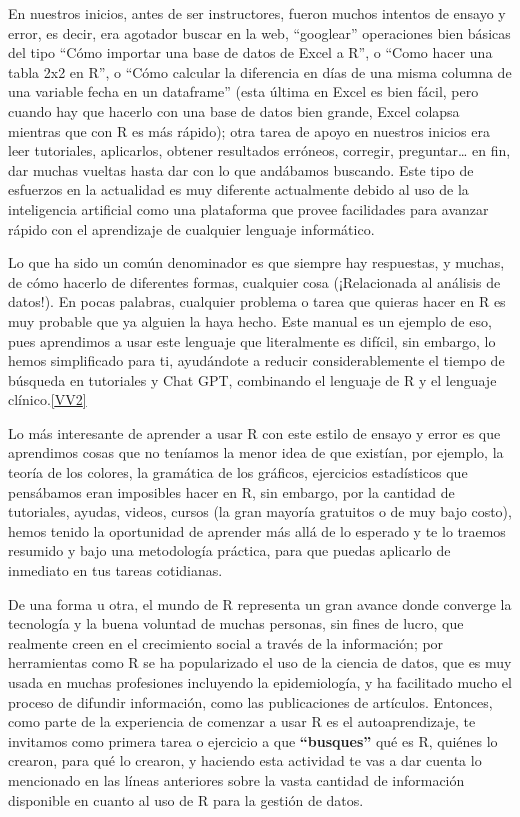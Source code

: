 \documentclass[
  letterpaper,
  DIV=11,
  numbers=noendperiod]{scrreprt}
\begin{document}
En nuestros inicios, antes de ser instructores, fueron muchos intentos
de ensayo y error, es decir, era agotador buscar en la web, ``googlear''
operaciones bien básicas del tipo ``Cómo importar una base de datos de
Excel a R'', o ``Como hacer una tabla 2x2 en R'', o ``Cómo calcular la
diferencia en días de una misma columna de una variable fecha en un
dataframe'' (esta última en Excel es bien fácil, pero cuando hay que
hacerlo con una base de datos bien grande, Excel colapsa mientras que
con R es más rápido); otra tarea de apoyo en nuestros inicios era leer
tutoriales, aplicarlos, obtener resultados erróneos, corregir,
preguntar\ldots{} en fin, dar muchas vueltas hasta dar con lo que
andábamos buscando. Este tipo de esfuerzos en la actualidad es muy
diferente actualmente debido al uso de la inteligencia artificial como
una plataforma que provee facilidades para avanzar rápido con el
aprendizaje de cualquier lenguaje informático.

Lo que ha sido un común denominador es que siempre hay respuestas, y
muchas, de cómo hacerlo de diferentes formas, cualquier cosa
(¡Relacionada al análisis de datos!). En pocas palabras, cualquier
problema o tarea que quieras hacer en R es muy probable que ya alguien
la haya hecho. Este manual es un ejemplo de eso, pues aprendimos a usar
este lenguaje que literalmente es difícil, sin embargo, lo hemos
simplificado para ti, ayudándote a reducir considerablemente el tiempo
de búsqueda en tutoriales y Chat GPT, combinando el lenguaje de R y el
lenguaje clínico.\hyperref[_msocom_2]{{[}VV2{]}}

Lo más interesante de aprender a usar R con este estilo de ensayo y
error es que aprendimos cosas que no teníamos la menor idea de que
existían, por ejemplo, la teoría de los colores, la gramática de los
gráficos, ejercicios estadísticos que pensábamos eran imposibles hacer
en R, sin embargo, por la cantidad de tutoriales, ayudas, videos, cursos
(la gran mayoría gratuitos o de muy bajo costo), hemos tenido la
oportunidad de aprender más allá de lo esperado y te lo traemos resumido
y bajo una metodología práctica, para que puedas aplicarlo de inmediato
en tus tareas cotidianas.

De una forma u otra, el mundo de R representa un gran avance donde
converge la tecnología y la buena voluntad de muchas personas, sin fines
de lucro, que realmente creen en el crecimiento social a través de la
información; por herramientas como R se ha popularizado el uso de la
ciencia de datos, que es muy usada en muchas profesiones incluyendo la
epidemiología, y ha facilitado mucho el proceso de difundir información,
como las publicaciones de artículos. Entonces, como parte de la
experiencia de comenzar a usar R es el autoaprendizaje, te invitamos
como primera tarea o ejercicio a que \textbf{``busques''} qué es R,
quiénes lo crearon, para qué lo crearon, y haciendo esta actividad te
vas a dar cuenta lo mencionado en las líneas anteriores sobre la vasta
cantidad de información disponible en cuanto al uso de R para la gestión
de datos.
\end{document}
